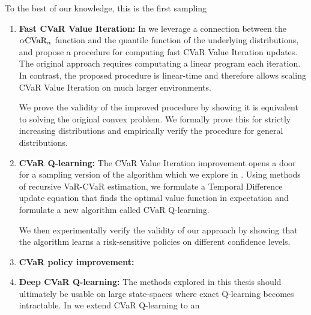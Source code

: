 To the best of our knowledge, this is the first sampling

\begin{enumerate}
\item \textbf{Fast CVaR Value Iteration:} In  we leverage a connection between the $\alpha\text{CVaR}_\alpha$ function and the quantile function of the underlying distributions, and propose a procedure for computing fast CVaR Value Iteration updates. The original approach requires computating a linear program each iteration. In contrast, the proposed procedure is linear-time and therefore allows scaling CVaR Value Iteration on much larger environments.

We prove the validity of the improved procedure by showing it is equivalent to solving the original convex problem. We formally prove this for strictly increasing distributions and empirically verify the procedure for general distributions.

\item \textbf{CVaR Q-learning:} The CVaR Value Iteration improvement opens a door for a sampling version of the algorithm which we explore in . Using methods of recursive VaR-CVaR estimation, we formulate a Temporal Difference update equation that finds the optimal value function in expectation and formulate a new algorithm called CVaR Q-learning. 

We then experimentally verify the validity of our approach by showing that the algorithm learns a risk-sensitive policies on different confidence levels.

\item \textbf{CVaR policy improvement:} 

\item \textbf{Deep CVaR Q-learning:} The methods explored in this thesis should ultimately be usable on large state-spaces where exact Q-learning becomes intractable. In  we extend CVaR Q-learning to an 
\end{enumerate}


